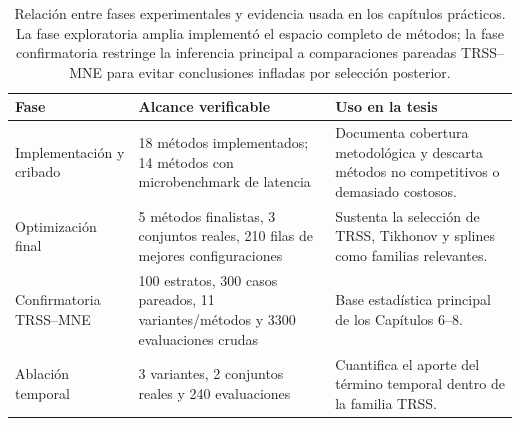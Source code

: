 \begin{table}[htbp]
\centering
\small
\caption{Relación entre fases experimentales y evidencia usada en los capítulos prácticos. La fase exploratoria amplia implementó el espacio completo de métodos; la fase confirmatoria restringe la inferencia principal a comparaciones pareadas TRSS--MNE para evitar conclusiones infladas por selección posterior.}
\label{tab:ch6_phase_map}
\begin{tabular}{@{}p{2.7cm}p{3.4cm}p{4.8cm}@{}}
\toprule
Fase & Alcance verificable & Uso en la tesis \\
\midrule
Implementación y cribado & 18 métodos implementados; 14 métodos con microbenchmark de latencia & Documenta cobertura metodológica y descarta métodos no competitivos o demasiado costosos. \\
Optimización final & 5 métodos finalistas, 3 conjuntos reales, 210 filas de mejores configuraciones & Sustenta la selección de TRSS, Tikhonov y splines como familias relevantes. \\
Confirmatoria TRSS--MNE & 100 estratos, 300 casos pareados, 11 variantes/métodos y 3300 evaluaciones crudas & Base estadística principal de los Capítulos 6--8. \\
Ablación temporal & 3 variantes, 2 conjuntos reales y 240 evaluaciones & Cuantifica el aporte del término temporal dentro de la familia TRSS. \\
\bottomrule
\end{tabular}
\end{table}
